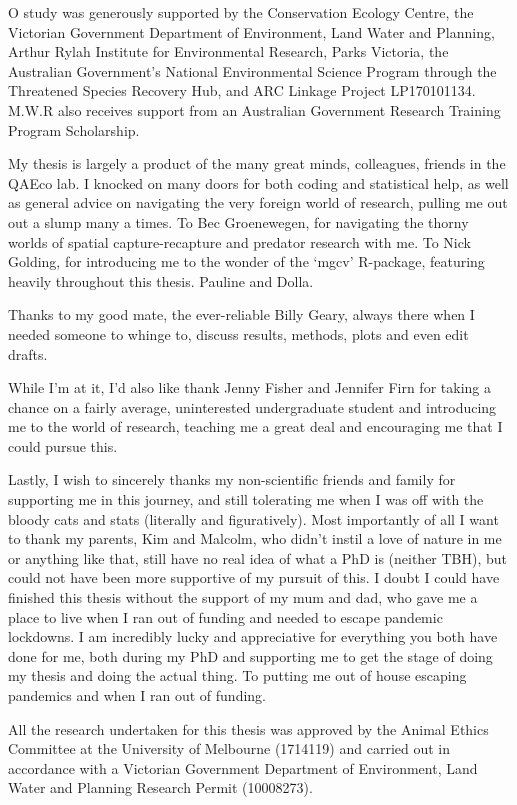 \documentclass[11pt,a4paper,titlepage,twoside,openright]{style/unimelbthesis}
\begin{document}
\begin{frontmatter}
\begin{acknowledgements}
    O study was generously supported by the Conservation Ecology Centre, the Victorian Government Department of Environment, Land Water and Planning, Arthur Rylah Institute for Environmental Research, Parks Victoria, the Australian Government's National Environmental Science Program through the Threatened Species Recovery Hub, and ARC Linkage Project LP170101134. M.W.R also receives support from an Australian Government Research Training Program Scholarship.
    
    My thesis is largely a product of the many great minds, colleagues, friends in the QAEco lab. I knocked on many doors for both coding and statistical help, as well as general advice on navigating the very foreign world of research, pulling me out out a slump many a times. To Bec Groenewegen, for navigating the thorny worlds of spatial capture-recapture and predator research with me. To Nick Golding, for introducing me to the wonder of the `mgcv' R-package, featuring heavily throughout this thesis.
    Pauline and Dolla.
    
    Thanks to my good mate, the ever-reliable Billy Geary, always there when I needed someone to whinge to, discuss results, methods, plots and even edit drafts.
    
    While I'm at it, I'd also like thank Jenny Fisher and Jennifer Firn for taking a chance on a fairly average, uninterested undergraduate student and introducing me to the world of research, teaching me a great deal and encouraging me that I could pursue this.
    
    Lastly, I wish to sincerely thanks my non-scientific friends and family for supporting me in this journey, and still tolerating me when I was off with the bloody cats and stats (literally and figuratively). Most importantly of all I want to thank my parents, Kim and Malcolm, who didn't instil a love of nature in me or anything like that, still have no real idea of what a PhD is (neither TBH), but could not have been more supportive of my pursuit of this. I doubt I could have finished this thesis without the support of my mum and dad, who gave me a place to live when I ran out of funding and needed to escape pandemic lockdowns. I am incredibly lucky and appreciative for everything you both have done for me, both during my PhD and supporting me to get the stage of doing my thesis and doing the actual thing. To putting me out of house escaping pandemics and when I ran out of funding.
    
    All the research undertaken for this thesis was approved by the Animal Ethics Committee at the University of Melbourne (1714119) and carried out in accordance with a Victorian Government Department of Environment, Land Water and Planning Research Permit (10008273).
  \end{acknowledgements}


\end{frontmatter}
\end{document}
